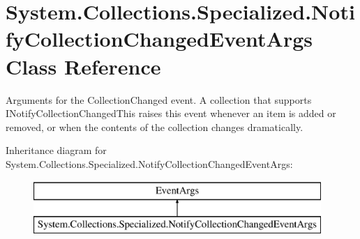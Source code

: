 \hypertarget{class_system_1_1_collections_1_1_specialized_1_1_notify_collection_changed_event_args}{}\section{System.\+Collections.\+Specialized.\+Notify\+Collection\+Changed\+Event\+Args Class Reference}
\label{class_system_1_1_collections_1_1_specialized_1_1_notify_collection_changed_event_args}


Arguments for the Collection\+Changed event. A collection that supports I\+Notify\+Collection\+Changed\+This raises this event whenever an item is added or removed, or when the contents of the collection changes dramatically.  


Inheritance diagram for System.\+Collections.\+Specialized.\+Notify\+Collection\+Changed\+Event\+Args\+:\begin{figure}[H]
\begin{center}
\leavevmode
\includegraphics[height=2.000000cm]{class_system_1_1_collections_1_1_specialized_1_1_notify_collection_changed_event_args}
\end{center}
\end{figure}
